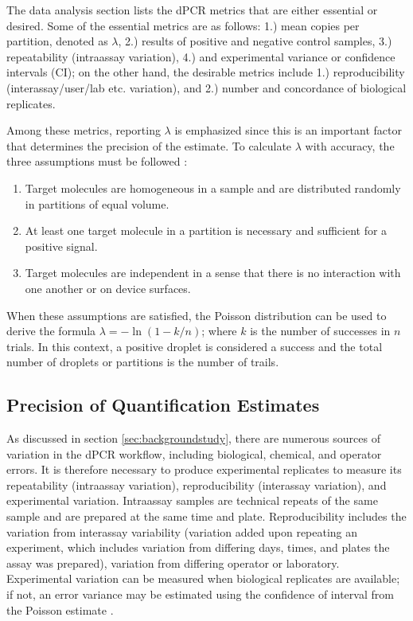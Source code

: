 The data analysis section lists the dPCR metrics that are either essential or desired. Some of the essential metrics are as follows: 1.) mean copies per partition, denoted as \(\lambda\), 2.) results of positive and negative control samples, 3.) repeatability (intraassay variation), 4.) and experimental variance or confidence intervals (CI); on the other hand, the desirable metrics include 1.) reproducibility (interassay/user/lab etc. variation), and 2.) number and concordance of biological replicates. 

Among these metrics, reporting \(\lambda\) is emphasized since this is an important factor that determines the precision of the estimate. To calculate \(\lambda\) with accuracy, the three assumptions must be followed \cite{Kreutz2011}:
\begin{enumerate}
    \item Target molecules are homogeneous in a sample and are distributed randomly in partitions of equal volume.
    \item At least one target molecule in a partition is necessary and sufficient for a positive signal.
    \item Target molecules are independent in a sense that there is no interaction with one another or on device surfaces.
\end{enumerate}

When these assumptions are satisfied, the Poisson distribution can be used to derive the formula \(\lambda = -\ln(1-k/n)\); where \(k\) is the number of successes in \(n\) trials. In this context, a positive droplet is considered a success and the total number of droplets or partitions is the number of trails.


\subsection{Precision of Quantification Estimates}
\label{sec:ch2_perfeval_essentialMetrics}
As discussed in section \ref{sec:backgroundstudy}, there are numerous sources of variation in the dPCR workflow, including biological, chemical, and operator errors. It is therefore necessary to produce experimental replicates to measure its repeatability (intraassay variation), reproducibility (interassay variation), and experimental variation. Intraassay samples are technical repeats of the same sample and are prepared at the same time and plate. Reproducibility includes the variation from interassay variability (variation added upon repeating an experiment, which includes variation from differing days, times, and plates the assay was prepared), variation from differing operator or laboratory. Experimental variation can be measured when biological replicates are available; if not, an error variance may be estimated using the confidence of interval from the Poisson estimate \cite{Huggett2013_MIQEGuidelines}.

